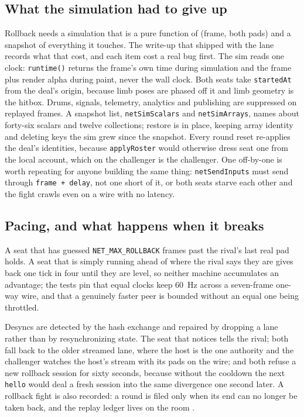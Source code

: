 \documentclass[10pt,letterpaper,twocolumn]{article}
\newcommand{\code}[1]{\texttt{\nolinkurl{#1}}}
\begin{document}
\subsection{What the simulation had to give up}
Rollback needs a simulation that is a pure function of (frame, both pads) and a snapshot of everything it touches. The write-up that shipped with the lane \citep{multiplayer} records what that cost, and each item cost a real bug first. The sim reads one clock: \code{runtime()} returns the frame's own time during simulation and the frame plus render alpha during paint, never the wall clock. Both seats take \code{startedAt} from the deal's origin, because limb poses are phased off it and limb geometry is the hitbox. Drums, signals, telemetry, analytics and publishing are suppressed on replayed frames. A snapshot list, \code{netSimScalars} and \code{netSimArrays}, names about forty-six scalars and twelve collections; restore is in place, keeping array identity and deleting keys the sim grew since the snapshot. Every round reset re-applies the deal's identities, because \code{applyRoster} would otherwise dress seat one from the local account, which on the challenger is the challenger. One off-by-one is worth repeating for anyone building the same thing: \code{netSendInputs} must send through \code{frame + delay}, not one short of it, or both seats starve each other and the fight crawls even on a wire with no latency.

\subsection{Pacing, and what happens when it breaks}
A seat that has guessed \code{NET\_MAX\_ROLLBACK} frames past the rival's last real pad holds. A seat that is simply running ahead of where the rival says they are gives back one tick in four until they are level, so neither machine accumulates an advantage; the tests pin that equal clocks keep 60~Hz across a seven-frame one-way wire, and that a genuinely faster peer is bounded without an equal one being throttled.

Desyncs are detected by the hash exchange and repaired by dropping a lane rather than by resynchronizing state. The seat that notices tells the rival; both fall back to the older streamed lane, where the host is the one authority and the challenger watches the host's stream with its pads on the wire; and both refuse a new rollback session for sixty seconds, because without the cooldown the next \code{hello} would deal a fresh session into the same divergence one second later. A rollback fight is also recorded: a round is filed only when its end can no longer be taken back, and the replay ledger lives on the room \citep{multiplayer}.
\end{document}
